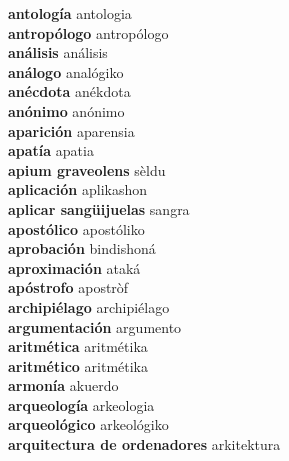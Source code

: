 \textbf{ antología  } antologia \\
\textbf{ antropólogo  } antropólogo \\
\textbf{ análisis  } análisis \\
\textbf{ análogo  } analógiko \\
\textbf{ anécdota  } anékdota \\
\textbf{ anónimo  } anónimo \\
\textbf{ aparición  } aparensia \\
\textbf{ apatía  } apatia \\
\textbf{ apium graveolens  } sèldu \\
\textbf{ aplicación  } aplikashon \\
\textbf{ aplicar sangüijuelas  } sangra \\
\textbf{ apostólico  } apostóliko \\
\textbf{ aprobación  } bindishoná \\
\textbf{ aproximación  } ataká \\
\textbf{ apóstrofo  } apostròf \\
\textbf{ archipiélago  } archipiélago \\
\textbf{ argumentación  } argumento \\
\textbf{ aritmética  } aritmétika \\
\textbf{ aritmético  } aritmétika \\
\textbf{ armonía  } akuerdo \\
\textbf{ arqueología  } arkeologia \\
\textbf{ arqueológico  } arkeológiko \\
\textbf{ arquitectura de ordenadores  } arkitektura \\
